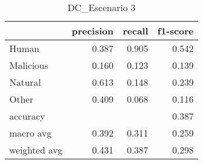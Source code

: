 \begin{table}
\centering
\caption{DC_Escenario 3}
\label{tab:Reporte de clasificación para el Escenario 3 utilizando Discriminante Cuadrático}
\begin{tabular}{lrrr}
\toprule
{} &  precision &  recall &  f1-score \\
\midrule
Human        &      0.387 &   0.905 &     0.542 \\
Malicious    &      0.160 &   0.123 &     0.139 \\
Natural      &      0.613 &   0.148 &     0.239 \\
Other        &      0.409 &   0.068 &     0.116 \\
accuracy     &            &         &     0.387 \\
macro avg    &      0.392 &   0.311 &     0.259 \\
weighted avg &      0.431 &   0.387 &     0.298 \\
\bottomrule
\end{tabular}
\end{table}
